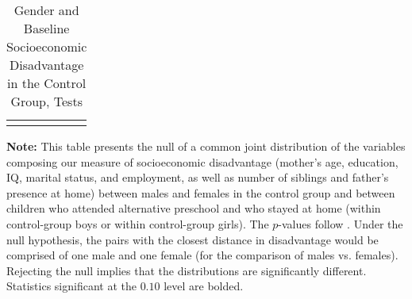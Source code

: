 


\newcommand*\leftright[2]{%
  \leavevmode
  \rlap{#1}%
  \hspace{0.5\linewidth}%
  #2}

\newcommand{\orth}{\ensuremath{\perp\!\!\!\perp}}%
\newcommand{\indep}{\orth}%
\newcommand{\notorth}{\ensuremath{\perp\!\!\!\!\!\!\diagup\!\!\!\!\!\!\perp}}%
\newcommand{\notindep}{\notorth}





\begin{table}[!htpb]
\begin{threeparttable}
\caption{Gender and Baseline Socioeconomic Disadvantage in the Control Group, Tests} \label{table:disadtests}
\centering
\begin{tabularx}{16.5cm}{XcX}
&  &
\end{tabularx}
\begin{tablenotes}
\footnotesize
\item \textbf{Note:} This table presents the null of a common joint distribution of the variables composing our measure of socioeconomic disadvantage (mother's age, education, IQ, marital status, and employment, as well as number of siblings and father's presence at home) between males and females in the control group and between children who attended  alternative preschool and who stayed at home (within control-group boys or within control-group girls). The $p$-values follow \citet{Rosenbaum_2005_Distribution_JRSS}. Under the null hypothesis, the pairs with the closest distance in disadvantage would be comprised of one male and one female (for the comparison of males vs. females). Rejecting the null implies that the distributions are significantly different. Statistics significant at the $0.10$ level are bolded.
\end{tablenotes}
\end{threeparttable}
\end{table}

